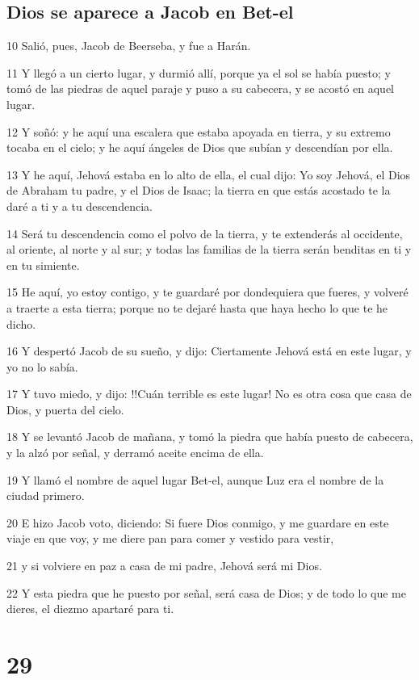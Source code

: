 \section*{Dios se aparece a Jacob en Bet-el}

\par 10 Salió, pues, Jacob de Beerseba, y fue a Harán.
\par 11 Y llegó a un cierto lugar, y durmió allí, porque ya el sol se había puesto; y tomó de las piedras de aquel paraje y puso a su cabecera, y se acostó en aquel lugar.
\par 12 Y soñó: y he aquí una escalera que estaba apoyada en tierra, y su extremo tocaba en el cielo; y he aquí ángeles de Dios que subían y descendían por ella.
\par 13 Y he aquí, Jehová estaba en lo alto de ella, el cual dijo: Yo soy Jehová, el Dios de Abraham tu padre, y el Dios de Isaac; la tierra en que estás acostado te la daré a ti y a tu descendencia.
\par 14 Será tu descendencia como el polvo de la tierra, y te extenderás al occidente, al oriente, al norte y al sur; y todas las familias de la tierra serán benditas en ti y en tu simiente.
\par 15 He aquí, yo estoy contigo, y te guardaré por dondequiera que fueres, y volveré a traerte a esta tierra; porque no te dejaré hasta que haya hecho lo que te he dicho.
\par 16 Y despertó Jacob de su sueño, y dijo: Ciertamente Jehová está en este lugar, y yo no lo sabía.
\par 17 Y tuvo miedo, y dijo: !!Cuán terrible es este lugar! No es otra cosa que casa de Dios, y puerta del cielo.
\par 18 Y se levantó Jacob de mañana, y tomó la piedra que había puesto de cabecera, y la alzó por señal, y derramó aceite encima de ella.
\par 19 Y llamó el nombre de aquel lugar Bet-el, aunque Luz era el nombre de la ciudad primero.
\par 20 E hizo Jacob voto, diciendo: Si fuere Dios conmigo, y me guardare en este viaje en que voy, y me diere pan para comer y vestido para vestir,
\par 21 y si volviere en paz a casa de mi padre, Jehová será mi Dios.
\par 22 Y esta piedra que he puesto por señal, será casa de Dios; y de todo lo que me dieres, el diezmo apartaré para ti.

\chapter{29}


